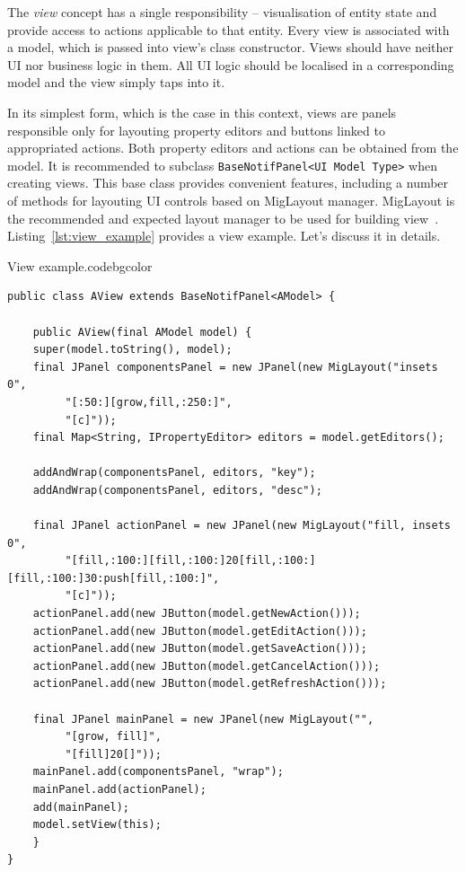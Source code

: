  The \emph{view} concept has a single responsibility -- visualisation of entity state and provide access to actions applicable to that entity.
  Every view is associated with a model, which is passed into view's class constructor.
  Views should have neither UI nor business logic in them.
  All UI logic should be localised in a corresponding model and the view simply taps into it.
  
  In its simplest form, which is the case in this context, views are panels responsible only for layouting property editors and buttons linked to appropriated actions.
  Both property editors and actions can be obtained from the model.  
  It is recommended to subclass \texttt{BaseNotifPanel<UI Model Type>} when creating views.
  This base class provides convenient features, including a number of methods for layouting UI controls based on MigLayout manager.
  MigLayout is the recommended and expected layout manager to be used for building view~\cite{MigLayout}.
  Listing~\ref{lst:view_example} provides a view example.
  Let's discuss it in details.  
  
    \begin{code}{View example.}{\label{lst:view_example}}{codebgcolor}
    \begin{lstlisting}
public class AView extends BaseNotifPanel<AModel> {    

    public AView(final AModel model) {
	super(model.toString(), model);
	final JPanel componentsPanel = new JPanel(new MigLayout("insets 0", 
	     "[:50:][grow,fill,:250:]", 
	     "[c]"));
	final Map<String, IPropertyEditor> editors = model.getEditors();

	addAndWrap(componentsPanel, editors, "key");
	addAndWrap(componentsPanel, editors, "desc");

	final JPanel actionPanel = new JPanel(new MigLayout("fill, insets 0", 
	     "[fill,:100:][fill,:100:]20[fill,:100:][fill,:100:]30:push[fill,:100:]", 
	     "[c]"));
	actionPanel.add(new JButton(model.getNewAction()));
	actionPanel.add(new JButton(model.getEditAction()));
	actionPanel.add(new JButton(model.getSaveAction()));
	actionPanel.add(new JButton(model.getCancelAction()));
	actionPanel.add(new JButton(model.getRefreshAction()));

	final JPanel mainPanel = new JPanel(new MigLayout("", 
	     "[grow, fill]", 
	     "[fill]20[]"));
	mainPanel.add(componentsPanel, "wrap");
	mainPanel.add(actionPanel);
	add(mainPanel);
	model.setView(this);
    }
}
    \end{lstlisting}
  \end{code}
  
